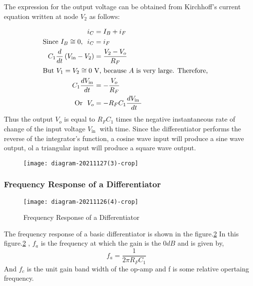    The expression for the output voltage can be obtained from Kirchhoff's current equation written at node $V_{2}$ as follows:
   
   \begin{align}
   i_{C}&=I_{B}+i_{F}\\
   \text{Since $I_{B} \cong 0$, } \
   i_{C} &=i_{F} \\
   C_{1} \frac{d}{d t}\left(V_{\mathrm{in}}-V_{2}\right) &=\frac{V_{2}-V_{o}}{R_{F}}\\
   \intertext{But $V_{1}=V_{2} \cong 0 \mathrm{~V}$, because $A$ is very large. Therefore, }
   C_{1} \frac{d V_{\mathrm{in}}}{d t}&=-\frac{V_{o}}{R_{F}}\\
   \text{Or }\
   V_{o}&=-R_{F} C_{1} \frac{d V_{\text {in }}}{d t}
   \end{align}
   Thus the output $V_{o}$ is equal to $R_{F} C_{1}$ times the negative instantaneous rate of change of the input voltage $V_{\text {in }}$ with time. Since the differentiator performs the reverse of the integrator's function, a cosine wave input will produce a sine wave output, ol a triangular input will produce a square wave output.
   \begin{figure}[H]
   	\centering
   	\texttt{[image: diagram-20211127(3)-crop]}
   	\caption{}
   	\label{}
   \end{figure} 
   \subsubsection{Frequency Response of a Differentiator}
   \begin{figure}[H]
   	\centering
   	\texttt{[image: diagram-20211126(4)-crop]}
   	\caption{Frequency Response of a Differentiator}
   	\label{Frequency  Differentiator}
   \end{figure}
   The frequency response of a basic differentiator is shown in the figure.\ref{Frequency  Differentiator}
   In this figure.\ref{Frequency  Differentiator} , $f_a$ is the frequency at which the gain is the $0dB$ and is given by,
   \begin{equation}
   f_a=\frac{1}{2 \pi R_FC_1}
   \end{equation}
   And $f_c$ is the unit gain band width of the op-amp and f is some relative opertaing frequency.\\
